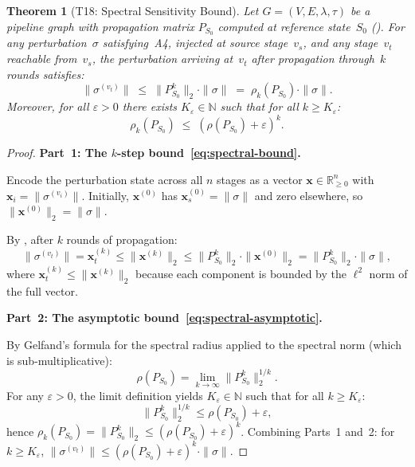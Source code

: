 \documentclass[11pt,a4paper]{article}
\newtheorem{theorem}{Theorem}[section]
\theoremstyle{definition}
\newcommand{\specnorm}[1]{\|#1\|_2}
\newcommand{\propmat}{P}
\newcommand{\propmatS}{\propmat_{S_0}}
\newcommand{\bbR}{\mathbb{R}}
\begin{document}
\begin{theorem}[T18: Spectral Sensitivity Bound]\label{thm:spectral}
Let $G = (V, E, \lambda, \tau)$ be a pipeline graph with propagation matrix
$\propmatS$ computed at reference state~$S_0$ ().
For any perturbation~$\sigma$ satisfying~A4, injected at source stage~$v_s$,
and any stage~$v_t$ reachable from~$v_s$, the perturbation arriving at~$v_t$
after propagation through~$k$ rounds satisfies:
\begin{equation}\label{eq:spectral-bound}
  \|\sigma^{(v_t)}\| \;\leq\; \specnorm{\propmatS^k} \cdot \|\sigma\|
  \;=\; \rho_k(\propmatS) \cdot \|\sigma\|.
\end{equation}
Moreover, for all $\varepsilon > 0$ there exists $K_\varepsilon \in \mathbb{N}$
such that for all $k \geq K_\varepsilon$:
\begin{equation}\label{eq:spectral-asymptotic}
  \rho_k(\propmatS) \;\leq\; (\rho(\propmatS) + \varepsilon)^k.
\end{equation}
\end{theorem}

\begin{proof}
\textbf{Part~1: The $k$-step bound~\eqref{eq:spectral-bound}.}

Encode the perturbation state across all $n$ stages as a vector
$\mathbf{x} \in \bbR_{\geq 0}^n$ with $\mathbf{x}_i = \|\sigma^{(v_i)}\|$.
Initially, $\mathbf{x}^{(0)}$ has $\mathbf{x}^{(0)}_s = \|\sigma\|$ and zero
elsewhere, so $\|\mathbf{x}^{(0)}\|_2 = \|\sigma\|$.

By , after $k$ rounds of propagation:
\[
  \|\sigma^{(v_t)}\|
  = \mathbf{x}^{(k)}_t
  \leq \|\mathbf{x}^{(k)}\|_2
  \leq \specnorm{\propmatS^k} \cdot \|\mathbf{x}^{(0)}\|_2
  = \specnorm{\propmatS^k} \cdot \|\sigma\|,
\]
where $\mathbf{x}^{(k)}_t \leq \|\mathbf{x}^{(k)}\|_2$ because each
component is bounded by the $\ell^2$ norm of the full vector.

\medskip
\textbf{Part~2: The asymptotic bound~\eqref{eq:spectral-asymptotic}.}

By Gelfand's formula for the spectral radius applied to the spectral norm
(which is sub-multiplicative):
\[
  \rho(\propmatS) = \lim_{k \to \infty} \specnorm{\propmatS^k}^{1/k}.
\]
For any $\varepsilon > 0$, the limit definition yields
$K_\varepsilon \in \mathbb{N}$ such that for all $k \geq K_\varepsilon$:
\[
  \specnorm{\propmatS^k}^{1/k} \leq \rho(\propmatS) + \varepsilon,
\]
hence $\rho_k(\propmatS) = \specnorm{\propmatS^k} \leq
(\rho(\propmatS) + \varepsilon)^k$.
Combining Parts~1 and~2: for $k \geq K_\varepsilon$,
$\|\sigma^{(v_t)}\| \leq (\rho(\propmatS) + \varepsilon)^k \cdot \|\sigma\|$.
\end{proof}
\end{document}
